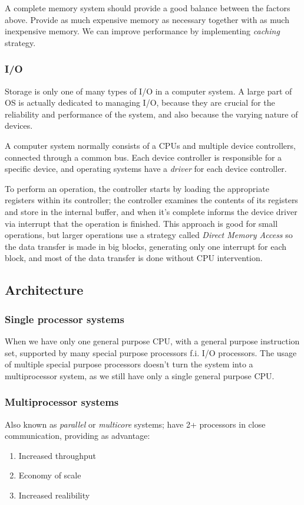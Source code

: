 \documentclass{article}
\begin{document}
A complete memory system should provide a good balance between the factors above. Provide as much expensive memory as necessary together with as much inexpensive memory. We can improve performance by implementing \emph{caching} strategy.

\subsubsection{I/O}
Storage is only one of many types of I/O in a computer system. A large part of OS is actually dedicated to managing I/O, because they are crucial for the reliability and performance of the system, and also because the varying nature of devices.

A computer system normally consists of a CPUs and multiple device controllers, connected through a common bus. Each device controller is responsible for a specific device, and operating systems have a \emph{driver} for each device controller.

To perform an operation, the controller starts by loading the appropriate registers within its controller; the controller examines the contents of its registers and store in the internal buffer, and when it's complete informs the device driver via interrupt that the operation is finished. This approach is good for small operations, but larger operations use a strategy called \emph{Direct Memory Access} so the data transfer is made in big blocks, generating only one interrupt for each block, and most of the data transfer is done without CPU intervention.

\subsection{Architecture}
\subsubsection{Single processor systems}
When we have only one general purpose CPU, with a general purpose instruction set, supported by many special purpose processors f.i. I/O processors. The usage of multiple special purpose processors doesn't turn the system into a multiprocessor system, as we still have only a single general purpose CPU.

\subsubsection{Multiprocessor systems}
Also known as \emph{parallel} or \emph{multicore} systems; have 2+ processors in close communication, providing as advantage:
\begin{enumerate}
  \item Increased throughput
  \item Economy of scale
  \item Increased realibility
\end{enumerate}
\end{document}

